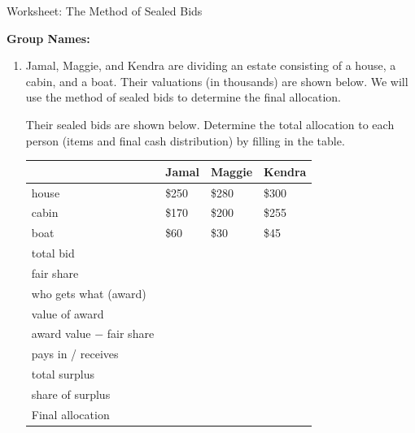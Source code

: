\documentclass[12pt]{article}
\begin{document}

\begin{center}
{\Large  Worksheet:  The Method of Sealed Bids	}
\end{center}

\noindent \textbf{Group Names:} \hrulefill



\begin{enumerate}
\item Jamal, Maggie, and Kendra are dividing an estate consisting of a house, a cabin, and
a boat.  Their valuations (in thousands) are shown below. We will use the method of sealed bids to determine the final allocation.

Their sealed bids are shown below. Determine the total allocation to each person (items and final cash distribution) by filling in the table. %

\begin{tabularx}{\linewidth}{| p{2in} | X | X | X|}
\hline
& {\bf Jamal} & {\bf Maggie} & {\bf Kendra } \\ \hline \hline
house &\$250 & \$280 & \$300\\ \hline
cabin & \$170 &\$200  & \$255 \\ \hline
boat & \$60& \$30& \$45 \\ \hline
total bid & & & \\[10pt] \hline
fair share & & & \\[10pt] \hline
 who gets what (award) & & & \\[12pt] \hline
 value of award  & & & \\[10pt] \hline
award value $-$ fair share  & & & \\[10pt] \hline
pays in / receives  & & & \\[10pt] \hline
total surplus   &  \multicolumn{3}{X|}{}  \\[10pt] \hline
share of surplus  & & & \\[10pt] \hline
 Final allocation & & & \\[20pt]
\hline
\end{tabularx}


\end{enumerate}
\end{document}

